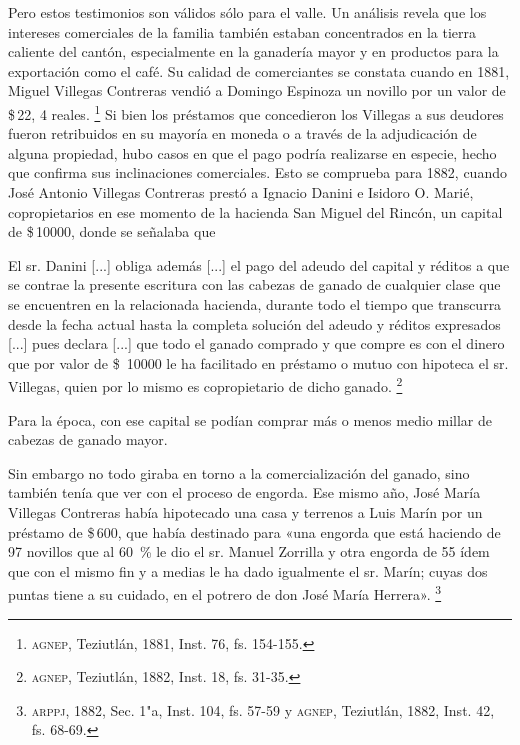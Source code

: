 \documentclass[14pt,twoside,final]{extbook} %
\let\oldfootnote\footnote
\renewcommand\footnote[1]{%
\oldfootnote{\hspace{1mm}#1}}
\begin{document}
Pero estos testimonios son válidos sólo para el valle. Un análisis revela que los intereses comerciales de la familia también estaban concentrados en la tierra caliente del cantón, especialmente en la ganadería mayor y en productos para la exportación como el café. Su calidad de comerciantes se constata cuando en 1881, Miguel Villegas Contreras vendió a Domingo Espinoza un novillo por un valor de \$\,22, 4 reales.\footnote{\textsc{agnep}, Teziutlán, 1881, Inst. 76, fs. 154-155.} Si bien los préstamos que concedieron los Villegas a sus deudores fueron retribuidos en su mayoría en moneda o a través de la adjudicación de alguna propiedad, hubo casos en que el pago podría realizarse en especie, hecho que confirma sus inclinaciones comerciales. Esto se comprueba para 1882, cuando José Antonio Villegas Contreras prestó a Ignacio Danini e Isidoro O. Marié, copropietarios en ese momento de la hacienda San Miguel del Rincón, un capital de \$\,10000, donde se señalaba que
\begin{quoting}
El sr. Danini [...] obliga además [...] el pago del adeudo del capital y réditos a que se contrae la presente escritura con las cabezas de ganado de cualquier clase que se encuentren en la relacionada hacienda, durante todo el tiempo que transcurra desde la fecha actual hasta la completa solución del adeudo y réditos expresados [...] pues declara [...] que todo el ganado comprado y que compre es con el dinero que por valor de \$~10000 le ha facilitado en préstamo o mutuo con hipoteca el sr. Villegas, quien por lo mismo es copropietario de dicho ganado.\footnote{\textsc{agnep}, Teziutlán, 1882, Inst. 18, fs. 31-35.}
\end{quoting}
Para la época, con ese capital se podían comprar más o menos medio millar de cabezas de ganado mayor.

Sin embargo no todo giraba en torno a la comercialización del ganado, sino también tenía que ver con el proceso de engorda. Ese mismo año, José María Villegas Contreras había hipotecado una casa y terrenos a Luis Marín por un préstamo de \$\,600, que había destinado para «una engorda que está haciendo de 97 novillos que al 60~\% le dio el sr. Manuel Zorrilla y otra engorda de 55 ídem que con el mismo fin y a medias le ha dado igualmente el sr. Marín; cuyas dos puntas tiene a su cuidado, en el potrero de don José María Herrera».\footnote{\textsc{arppj}, 1882, Sec. 1"a, Inst. 104, fs. 57-59 y \textsc{agnep}, Teziutlán, 1882, Inst. 42, fs. 68-69.}
\end{document}
